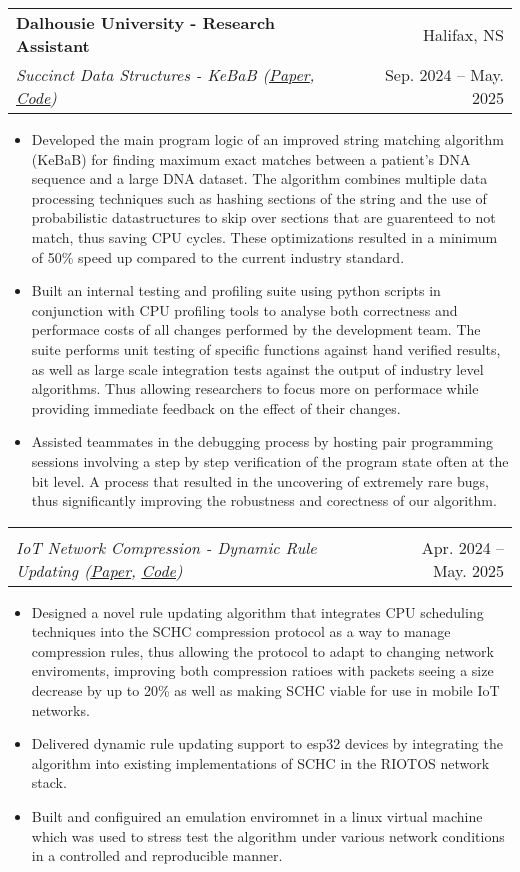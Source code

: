 \documentclass[letterpaper,11pt]{article}
\makeatletter
\newcommand{\resumeItem}[1]{
  \item\small{
    {#1 \vspace{-2pt}}
  }
}
\newcommand{\resumeSubheading}[4]{
  \vspace{-2pt}\item
    \begin{tabular*}{0.97\textwidth}[t]{l@{\extracolsep{\fill}}r}
      \textbf{#1} & #2 \\
			\textit{\small#3} & \small #4 \\
    \end{tabular*}\vspace{-7pt}
}
\newcommand{\resumeItemListStart}{\begin{itemize}}
\newcommand{\resumeItemListEnd}{\end{itemize}\vspace{-5pt}}
\makeatother
\begin{document}
	\resumeSubheading
      {Dalhousie University - Research Assistant}{Halifax, NS}
      {Succinct Data Structures - KeBaB (\href{https://arxiv.org/abs/2502.20338}{\underline{Paper}}, \href{https://github.com/SuchithSridhar/Compact-DNA-Data-Structures}{\underline{Code}})
}{Sep. 2024 -- May. 2025}
      \resumeItemListStart
        \resumeItem{Developed the main program logic of an improved string matching algorithm (KeBaB) for finding maximum exact
					matches between a patient's DNA sequence and a large DNA dataset. The algorithm combines multiple data processing techniques such as
					hashing sections of the string and the use of probabilistic datastructures to skip over sections that are guarenteed to not match, thus saving 
					CPU cycles. These optimizations resulted in a minimum of 50\% speed up compared to the current industry standard.
				}
        \resumeItem{Built an internal testing and profiling suite using python scripts in conjunction with CPU profiling tools to analyse both correctness
					and performace costs of all changes performed by the development team. The suite performs unit testing of specific functions against hand verified results, as
			well as large scale integration tests against the output of industry level algorithms. Thus allowing researchers to focus more on performace while providing immediate feedback on the effect of their changes.}
				\resumeItem{Assisted teammates in the debugging process by hosting pair programming sessions involving a step by step verification of the program state often at the bit level. A process
				that resulted in the uncovering of extremely rare bugs, thus significantly improving the 
			robustness and corectness of our algorithm.}
      \resumeItemListEnd 

	\vspace{-12pt}
  \resumeSubheading
		{}{}
      {IoT Network Compression - Dynamic Rule Updating (\href{https://github.com/pthread-me/Dynamic-Context-Update-SCHC/blob/main/Thesis.pdf}{\underline{Paper}}, \href{https://github.com/pthread-me/Dynamic-Context-Update-SCHC}{\underline{Code}})}{Apr. 2024 -- May. 2025}
      \resumeItemListStart
				\resumeItem{Designed a novel rule updating algorithm that integrates CPU scheduling techniques into the
				SCHC compression protocol as a way to manage compression rules, thus allowing the protocol to adapt to changing network enviroments, 
				improving both compression ratioes with packets seeing a size decrease by up to 20\% as well as making SCHC viable for use in mobile
				IoT networks.}
				\resumeItem{Delivered dynamic rule updating support to esp32 devices by integrating the algorithm into existing 
				implementations of SCHC in the RIOTOS network stack.}
				\resumeItem{Built and configuired an emulation enviromnet in a linux virtual machine which was used to stress test the algorithm under various network conditions in a controlled and reproducible manner.}
			\resumeItemListEnd 
\end{document}
